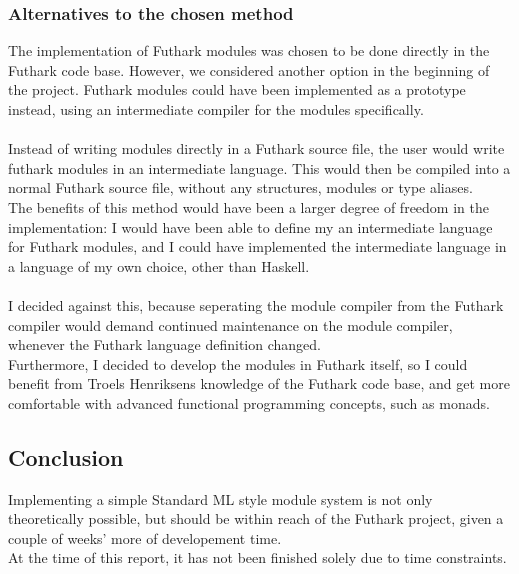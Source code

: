 \subsubsection{Alternatives to the chosen method}
The implementation of Futhark modules was chosen to be done directly in the
Futhark code base.
However, we considered another option in the beginning of the project.
Futhark modules could have been implemented as a prototype instead, using an
intermediate compiler for the modules specifically.
\\
\\
Instead of writing modules directly in a Futhark source file, the user would
write futhark modules in an intermediate language.
This would then be compiled into a normal Futhark source file, without any structures, modules or type aliases.
\\
The benefits of this method would have been a larger degree of freedom in the
implementation: I would have been able to define my an intermediate language for Futhark
modules, and I could have implemented the intermediate language in a language of
my own choice, other than Haskell.
\\
\\
I decided against this, because seperating the module compiler from the Futhark
compiler would demand continued maintenance on the module compiler, whenever the
Futhark language definition changed.\\
Furthermore, I decided to develop the modules in Futhark itself, so I could
benefit from Troels Henriksens knowledge of the Futhark code base, and get more
comfortable with advanced functional programming concepts, such as monads.

\subsection{Conclusion}
Implementing a simple Standard ML style module system is not only theoretically
possible, but should be within reach of the Futhark project, given a couple of
weeks' more of developement time.
\\
At the time of this report, it has not been finished solely due to time constraints.
\\
\\

